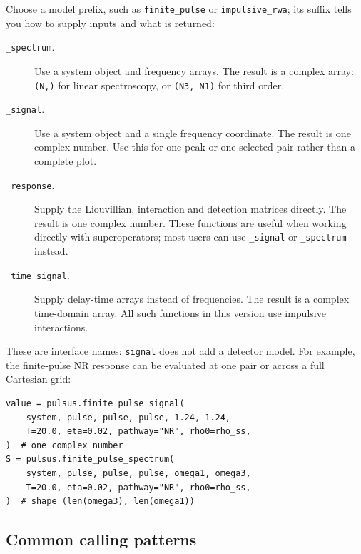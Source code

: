 Choose a model prefix, such as \texttt{finite\_pulse} or
\texttt{impulsive\_rwa}; its suffix tells you how to supply inputs
and what is returned:
\begin{description}
\item[\texttt{\_spectrum}.] Use a system object and frequency arrays.
The result is a complex array: \texttt{(N,)} for linear spectroscopy,
or \texttt{(N3, N1)} for third order.
\item[\texttt{\_signal}.] Use a system object and a single frequency
coordinate. The result is one complex number. Use this for one peak or
one selected pair rather than a complete plot.
\item[\texttt{\_response}.] Supply the Liouvillian, interaction and
detection matrices directly. The result is one complex number.
These functions are useful when working directly with superoperators;
most users can use \texttt{\_signal} or \texttt{\_spectrum} instead.
\item[\texttt{\_time\_signal}.] Supply delay-time arrays instead of
frequencies. The result is a complex time-domain array. All such functions
in this version use impulsive interactions.
\end{description}

These are interface names: \texttt{signal} does not add a detector model.
For example, the finite-pulse NR response can be evaluated at one pair
or across a full Cartesian grid:
\par\noindent
\begin{minipage}{\linewidth}
\begin{lstlisting}[style=python]
value = pulsus.finite_pulse_signal(
    system, pulse, pulse, pulse, 1.24, 1.24,
    T=20.0, eta=0.02, pathway="NR", rho0=rho_ss,
)  # one complex number
S = pulsus.finite_pulse_spectrum(
    system, pulse, pulse, pulse, omega1, omega3,
    T=20.0, eta=0.02, pathway="NR", rho0=rho_ss,
)  # shape (len(omega3), len(omega1))
\end{lstlisting}
\end{minipage}\par

\clearpage
\subsection{Common calling patterns}


